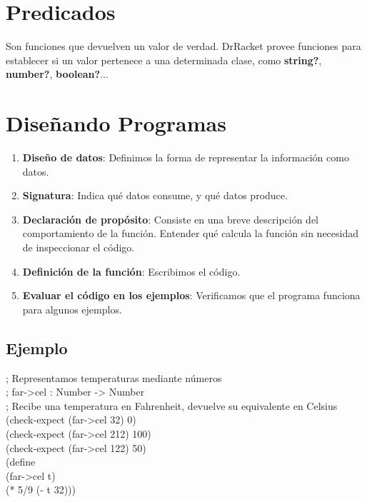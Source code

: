 \documentclass[11pt,a4paper]{article}
\begin{document}
\section{Predicados}
Son funciones que devuelven un valor de verdad. DrRacket provee funciones para establecer si un valor pertenece a una
determinada clase, como \textbf{string?}, \textbf{number?}, \textbf{boolean?}...

\newpage
\section{Dise\~nando Programas}
\begin{enumerate}
\item \textbf{Diseño de datos}: Definimos la forma de representar la información como datos.
\item \textbf{Signatura}: Indica qué datos consume, y qué datos produce.
\item \textbf{Declaración de propósito}: Consiste en una breve descripción del comportamiento de la función. Entender qué calcula la función sin necesidad de inspeccionar el código.
\item \textbf{Definición de la función}: Escribimos el código.
\item \textbf{Evaluar el código en los ejemplos}: Verificamos que el programa funciona para algunos ejemplos.
\end{enumerate}
\subsection{Ejemplo}
\begin{siderules}
; Representamos temperaturas mediante números\\
; far->cel : Number -> Number\\
; Recibe una temperatura en Fahrenheit, devuelve su equivalente en Celsius\\
(check-expect (far->cel 32) 0)\\
(check-expect (far->cel 212) 100)\\
(check-expect (far->cel 122) 50)\\
(define\\
\indent \indent (far->cel t)\\
\indent \indent (* 5/9 (- t 32)))
\end{siderules}
\end{document}
